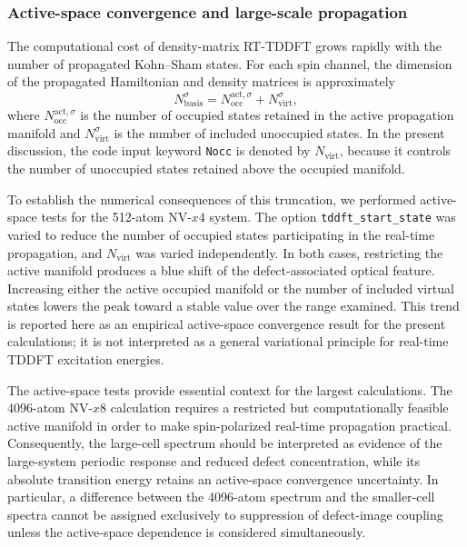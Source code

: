 \subsubsection{Active-space convergence and large-scale propagation}

The computational cost of density-matrix RT-TDDFT grows rapidly with
the number of propagated Kohn--Sham states.  For each spin channel, the
dimension of the propagated Hamiltonian and density matrices is
approximately
%
\begin{equation}
N_{\mathrm{basis}}^\sigma =
N_{\mathrm{occ}}^{\mathrm{act},\sigma}
+
N_{\mathrm{virt}}^\sigma,
\label{eq:nv-active-space}
\end{equation}
%
where $N_{\mathrm{occ}}^{\mathrm{act},\sigma}$ is the number of
occupied states retained in the active propagation manifold and
$N_{\mathrm{virt}}^\sigma$ is the number of included unoccupied
states.  In the present discussion, the code input keyword
\texttt{Nocc} is denoted by $N_{\mathrm{virt}}$, because it controls
the number of unoccupied states retained above the occupied manifold.

To establish the numerical consequences of this truncation, we
performed active-space tests for the 512-atom NV-$x4$ system.  The
option \texttt{tddft\_start\_state} was varied to reduce the number of
occupied states participating in the real-time propagation, and
$N_{\mathrm{virt}}$ was varied independently.  In both cases,
restricting the active manifold produces a blue shift of the
defect-associated optical feature.  Increasing either the active
occupied manifold or the number of included virtual states lowers the
peak toward a stable value over the range examined.  This trend is
reported here as an empirical active-space convergence result for the
present calculations; it is not interpreted as a general variational
principle for real-time TDDFT excitation energies.

The active-space tests provide essential context for the largest
calculations.  The 4096-atom NV-$x8$ calculation requires a restricted
but computationally feasible active manifold in order to make
spin-polarized real-time propagation practical.  Consequently, the
large-cell spectrum should be interpreted as evidence of the
large-system periodic response and reduced defect concentration, while
its absolute transition energy retains an active-space convergence
uncertainty.  In particular, a difference between the 4096-atom
spectrum and the smaller-cell spectra cannot be assigned exclusively
to suppression of defect-image coupling unless the active-space
dependence is considered simultaneously.

